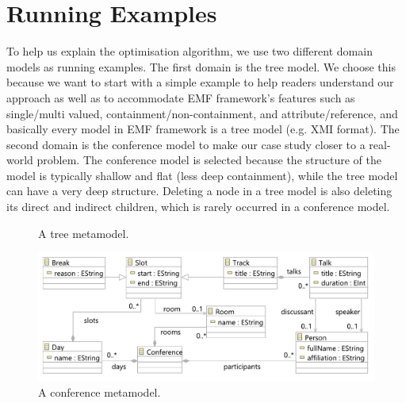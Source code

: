 \documentclass{llncs}
\begin{document}
\section{Running Examples}
\label{sec:case_study}
To help us explain the optimisation algorithm, we use two different domain models as running examples. The first domain is the tree model. We choose this because we want to start with a simple example to help readers understand our approach as well as to accommodate EMF framework's features such as single/multi valued, containment/non-containment, and attribute/reference, and basically every model in EMF framework is a tree model (e.g. XMI format). The second domain is the conference model to make our case study closer to a real-world problem. The conference model is selected because the structure of the model is typically shallow and flat (less deep containment), while the tree model can have a very deep structure. Deleting a node in a tree model is also deleting its direct and indirect children, which is rarely occurred in a conference model. 
   
\begin{figure}[ht]
\begin{minipage}[t]{0.35\linewidth}
    \centering
    \caption{A tree metamodel.}
    \label{fig:node_metamodel}
\end{minipage}
    \hfill
\begin{minipage}[t]{0.65\linewidth}
    \includegraphics[width=\linewidth]{conference_metamodel}
    \caption{A conference metamodel.}   
    \label{fig:node_metamodel}
\end{minipage} 
\end{figure}
\end{document}
